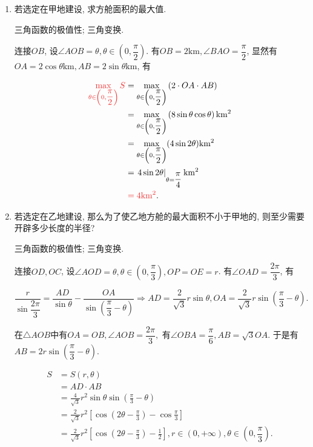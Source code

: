 \documentclass[8pt]{article}
\begin{document}
			\begin{enumerate}[label=\defmath{(\arabic*)}]
				\item 若选定在甲地建设, 求方舱面积的最大值. 

					三角函数的极值性; 三角变换.

					连接\(OB\), 设\(\angle AOB = \theta, \theta \in \left(0, \dfrac{\pi}{2}\right)\). 有\(OB = 2\mathrm{km}, \angle BAO = \dfrac{\pi}{2}\), 显然有\(OA = 2\cos \theta \mathrm{km}, AB = 2\sin \theta \mathrm{km}\), 有

					\begin{align*}
					\ansmath{\max_{\theta \in \left(0, \dfrac{\pi}{2}\right)}S} &= \max_{\theta \in \left(0, \dfrac{\pi}{2}\right)} \left(2 \cdot OA \cdot AB\right)\\
					&= \max_{\theta \in \left(0, \dfrac{\pi}{2}\right)} \left(8 \sin \theta \cos \theta\right) \mathrm{km^2}\\
					&= \max_{\theta \in \left(0, \dfrac{\pi}{2}\right)}(4 \sin 2 \theta) \mathrm{km^2}\\
					&= \at{4 \sin 2 \theta}{\theta = \dfrac{\pi}{4}}\mathrm{km^2}\\
					&\ansmath{= 4 \mathrm{km^2}}.
					\end{align*}

				\item 若选定在乙地建设, 那么为了使乙地方舱的最大面积不小于甲地的, 则至少需要开辟多少长度的半径? 

					三角函数的极值性; 三角变换.

					连接\(OD, OC\), 设\(\angle AOD = \theta, \theta \in \left(0, \dfrac{\pi}{3}\right), OP=OE=r\). 有\(\angle OAD = \dfrac{2\pi}{3}\), 有

					\[
						\frac{r}{\sin\dfrac{2\pi}{3}} = \dfrac{AD}{\sin \theta} - \dfrac{OA}{\sin \left(\dfrac{\pi}{3} - \theta\right)} \Rightarrow AD = \dfrac{2}{\sqrt{3}}r\sin \theta, OA = \dfrac{2}{\sqrt{3}}r\sin \left(\dfrac{\pi}{3} - \theta\right).
					\]

					在\(\triangle AOB\)中有\(OA=OB, \angle AOB = \dfrac{2\pi}{3},\) 有\(\angle OBA = \dfrac{\pi}{6}, AB = \sqrt{3} OA\). 于是有\(AB=2r\sin \left(\dfrac{\pi}{3}-\theta\right)\).

					\begin{align*}
						S &= S(r, \theta)\\
						  &= AD \cdot AB\\
						  &= \frac{4}{\sqrt{3}} r^2 \sin\theta \sin\left(\frac{\pi}{3} - \theta\right)\\
						  &= \frac{2}{\sqrt{3}} r^2 \left[\cos \left(2\theta - \frac{\pi}{3}\right) - \cos \frac{\pi}{3}\right]\\
						  &= \frac{2}{\sqrt{3}} r^2 \left[\cos \left(2\theta - \frac{\pi}{3}\right) - \frac{1}{2}\right], r \in (0, +\infty), \theta \in \left(0, \dfrac{\pi}{3}\right).
					\end{align*}


\end{enumerate}
\end{document}
